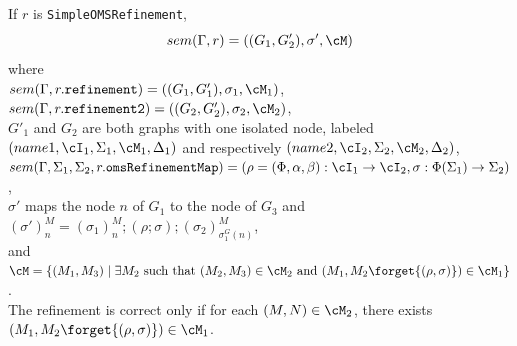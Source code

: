 \documentclass[10pt, a4paper]{isov2}
\newcommand*{\syntax}[1]{\texttt{#1}}
\begin{document}
%

If $r$ is \syntax{SimpleOMSRefinement},
$$sem(\Gamma, r) = 
((G_1,G'_2),\sigma', \cM)$$
where\\
 $sem(\Gamma,  r.\syntax{refinement}) = ((G_1,G'_1), \sigma_1,\cM_1)$,\\
 $sem(\Gamma,  r.\syntax{refinement2}) = ((G_2, G'_2),\sigma_2, \cM_2)$,\\ 
 $G'_1$ and $G_2$ are both graphs with one isolated node, labeled
 $(name1,\cI_1,\Sigma_1,\cM_1,\Delta_1)$
 and respectively
 $(name2,\cI_2,\Sigma_2,\cM_2,\Delta_2)$,
 $sem(\Gamma, \Sigma_1, \Sigma_2, r.\syntax{omsRefinementMap}) = (\rho = (\Phi,\alpha,\beta):\cI_1\to\cI_2,\sigma:\Phi(\Sigma_1)\to\Sigma_2)$,\\
 $\sigma'$ maps the node $n$ of $G_1$ to the node of $G_3$ and 
 $(\sigma')^M_n = (\sigma_1)^M_n;(\rho;\sigma);(\sigma_2)^M_{\sigma_1^G(n)}$,\\
 and $\cM = \{ (M_1, M_3)\mid \exists M_2 \text{ such that }
  (M_2,M_3) \in \cM_2 \text{ and }
  (M_1,M_2\forget{(\rho,\sigma)}) \in \cM_1 \}$.\\
 The refinement is correct only if
 for each $(M,N)\in\cM_2$, 
 there exists
 $(M_1,M_2\forget{(\rho,\sigma)})\in \cM_1$.
 
\end{document}

